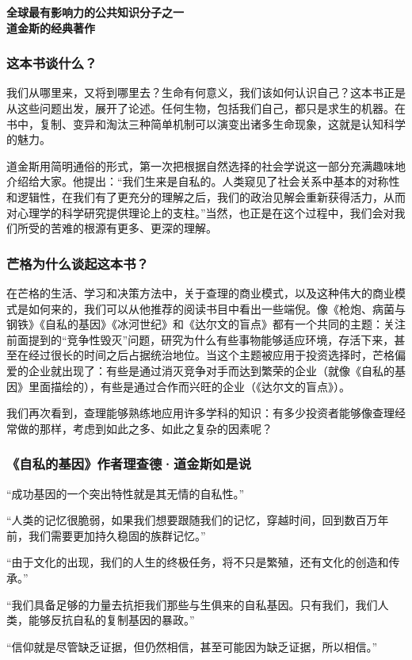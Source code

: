\cleardoublepage
{}


\begin{BookSummaryBox}
{\centering \textbf{全球最有影响力的公共知识分子之一\\ 道金斯的经典著作}\par}
\end{BookSummaryBox}

\subsubsection*{这本书谈什么？}

我们从哪里来，又将到哪里去？生命有何意义，我们该如何认识自己？这本书正是从这些问题出发，展开了论述。任何生物，包括我们自己，都只是求生的机器。在书中，复制、变异和淘汰三种简单机制可以演变出诸多生命现象，这就是认知科学的魅力。
\par

道金斯用简明通俗的形式，第一次把根据自然选择的社会学说这一部分充满趣味地介绍给大家。他提出：“我们生来是自私的。人类窥见了社会关系中基本的对称性和逻辑性，在我们有了更充分的理解之后，我们的政治见解会重新获得活力，从而对心理学的科学研究提供理论上的支柱。”当然，也正是在这个过程中，我们会对我们所受的苦难的根源有更多、更深的理解。
\par

\subsubsection*{芒格为什么谈起这本书？}

在芒格的生活、学习和决策方法中，关于查理的商业模式，以及这种伟大的商业模式是如何来的，我们可以从他推荐的阅读书目中看出一些端倪。像《枪炮、病菌与钢铁》《自私的基因》《冰河世纪》和《达尔文的盲点》都有一个共同的主题：关注前面提到的“竞争性毁灭”问题，研究为什么有些事物能够适应环境，存活下来，甚至在经过很长的时间之后占据统治地位。当这个主题被应用于投资选择时，芒格偏爱的企业就出现了：有些是通过消灭竞争对手而达到繁荣的企业（就像《自私的基因》里面描绘的），有些是通过合作而兴旺的企业（《达尔文的盲点》）。
\par

我们再次看到，查理能够熟练地应用许多学科的知识：有多少投资者能够像查理经常做的那样，考虑到如此之多、如此之复杂的因素呢？
\par

\subsubsection*{《自私的基因》作者理查德·道金斯如是说}

“成功基因的一个突出特性就是其无情的自私性。”
\par

“人类的记忆很脆弱，如果我们想要跟随我们的记忆，穿越时间，回到数百万年前，我们需要更加持久稳固的族群记忆。”
\par

“由于文化的出现，我们的人生的终极任务，将不只是繁殖，还有文化的创造和传承。”
\par

“我们具备足够的力量去抗拒我们那些与生俱来的自私基因。只有我们，我们人类，能够反抗自私的复制基因的暴政。”
\par

“信仰就是尽管缺乏证据，但仍然相信，甚至可能因为缺乏证据，所以相信。”
\par

